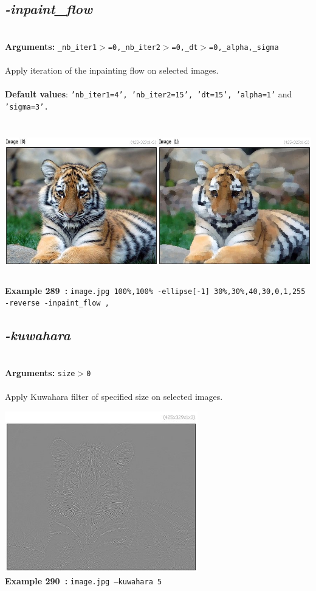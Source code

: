 \documentclass[a4paper,11pt,twoside]{book}
\begin{document}
\subsection{\emph{-inpaint\_flow} }\vspace*{-0.5em}
~\\\textbf{Arguments: } 
{\small \texttt{\_nb\_iter1$>$=0,\_nb\_iter2$>$=0,\_dt$>$=0,\_alpha,\_sigma}}\\~\\
Apply iteration of the inpainting flow on selected images.
~\\~\\\textbf{Default values}: {\small \texttt{'nb\_iter1=4', 'nb\_iter2=15', 'dt=15', 'alpha=1'} and \texttt{'sigma=3'.}}
\begin{center}\includegraphics[keepaspectratio=true,height=7cm,width=\textwidth]{img/gmic_def289.jpg}\\
{\footnotesize \textbf{Example 289~:} \texttt{image.jpg 100\%,100\% -ellipse[-1] 30\%,30\%,40,30,0,1,255 -reverse -inpaint\_flow ,}}
\end{center}

\subsection{\emph{-kuwahara} }\vspace*{-0.5em}
~\\\textbf{Arguments: } 
{\small \texttt{size$>$0}}\\~\\
Apply Kuwahara filter of specified size on selected images.
\begin{center}\includegraphics[keepaspectratio=true,height=7cm,width=\textwidth]{img/gmic_def290.jpg}\\
{\footnotesize \textbf{Example 290~:} \texttt{image.jpg --kuwahara 5}}
\end{center}
\end{document}
